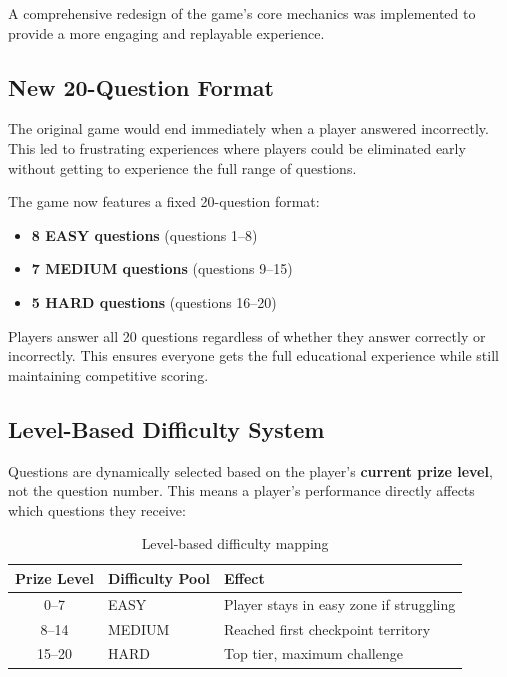 \documentclass[11pt,a4paper]{article}
\begin{document}
A comprehensive redesign of the game's core mechanics was implemented to provide a more engaging and replayable experience.

\subsection{New 20-Question Format}

\begin{issuebox}
The original game would end immediately when a player answered incorrectly. This led to frustrating experiences where players could be eliminated early without getting to experience the full range of questions.
\end{issuebox}

\begin{fixbox}
The game now features a fixed 20-question format:
\begin{itemize}
    \item \textbf{8 EASY questions} (questions 1--8)
    \item \textbf{7 MEDIUM questions} (questions 9--15)
    \item \textbf{5 HARD questions} (questions 16--20)
\end{itemize}
Players answer all 20 questions regardless of whether they answer correctly or incorrectly. This ensures everyone gets the full educational experience while still maintaining competitive scoring.
\end{fixbox}

\subsection{Level-Based Difficulty System}

Questions are dynamically selected based on the player's \textbf{current prize level}, not the question number. This means a player's performance directly affects which questions they receive:

\begin{table}[h]
\centering
\begin{tabular}{@{}cll@{}}
\toprule
\textbf{Prize Level} & \textbf{Difficulty Pool} & \textbf{Effect} \\
\midrule
0--7 & EASY & Player stays in easy zone if struggling \\
8--14 & MEDIUM & Reached first checkpoint territory \\
15--20 & HARD & Top tier, maximum challenge \\
\bottomrule
\end{tabular}
\caption{Level-based difficulty mapping}
\end{table}
\end{document}
